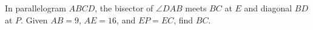 In parallelogram $ABCD$, the bisector of $\angle DAB$ meets $BC$ at $E$ and diagonal $BD$ at $P$. Given $AB=9$, $AE=16$, and $EP=EC$, find $BC$.
